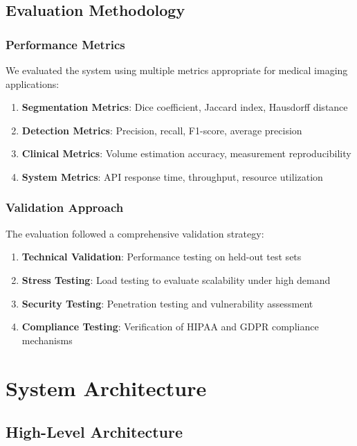 \documentclass[12pt,a4paper]{article}
\begin{document}
\subsection{Evaluation Methodology}

\subsubsection{Performance Metrics}

We evaluated the system using multiple metrics appropriate for medical imaging applications:

\begin{enumerate}
    \item \textbf{Segmentation Metrics}: Dice coefficient, Jaccard index, Hausdorff distance
    \item \textbf{Detection Metrics}: Precision, recall, F1-score, average precision
    \item \textbf{Clinical Metrics}: Volume estimation accuracy, measurement reproducibility
    \item \textbf{System Metrics}: API response time, throughput, resource utilization
\end{enumerate}

\subsubsection{Validation Approach}

The evaluation followed a comprehensive validation strategy:

\begin{enumerate}
    \item \textbf{Technical Validation}: Performance testing on held-out test sets
    \item \textbf{Stress Testing}: Load testing to evaluate scalability under high demand
    \item \textbf{Security Testing}: Penetration testing and vulnerability assessment
    \item \textbf{Compliance Testing}: Verification of HIPAA and GDPR compliance mechanisms
\end{enumerate}

\section{System Architecture}

\subsection{High-Level Architecture}
\end{document}
